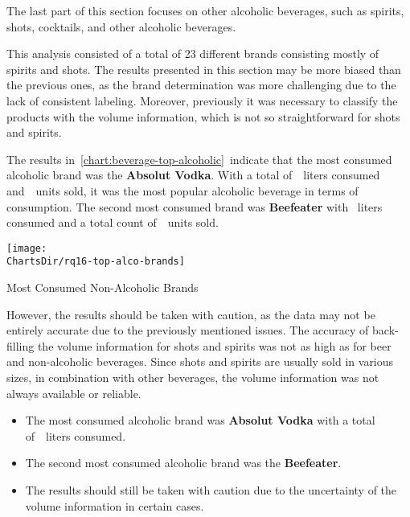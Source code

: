 The last part of this section focuses on other alcoholic beverages, such as spirits, shots, cocktails, and other alcoholic beverages.


This analysis consisted of a total of 23 different brands consisting mostly of spirits and shots.
The results presented in this section may be more biased than the previous ones, as the brand determination was more challenging due to the lack of consistent labeling.
Moreover, previously it was necessary to classify the products with the volume information, which is not so straightforward for shots and spirits.

The results in~\autoref{chart:beverage-top-alcoholic}~indicate that the most consumed alcoholic brand was the \textbf{Absolut Vodka}.
With a total of~~liters consumed and~~units sold, it was the most popular alcoholic beverage in terms of consumption.
The second most consumed brand was \textbf{Beefeater} with ~liters consumed and a total count of~~units sold.

\begin{chart}[H]
	\centering
	\texttt{[image: \\ChartsDir/rq16-top-alco-brands]}
	\caption{ Most Consumed Non-Alcoholic Brands}
	\label{chart:beverage-top-alcoholic}
	\source
\end{chart}

However, the results should be taken with caution, as the data may not be entirely accurate due to the previously mentioned issues.
The accuracy of back-filling the volume information for shots and spirits was not as high as for beer and non-alcoholic beverages.
Since shots and spirits are usually sold in various sizes, in combination with other beverages, the volume information was not always available or reliable.

\begin{keytakeaways}
	\begin{itemize}
		\item The most consumed alcoholic brand was \textbf{Absolut Vodka} with a total of~~liters consumed.
		\item The second most consumed alcoholic brand was the \textbf{Beefeater}.
		\item The results should still be taken with caution due to the uncertainty of the volume information in certain cases.
	\end{itemize}
\end{keytakeaways}


